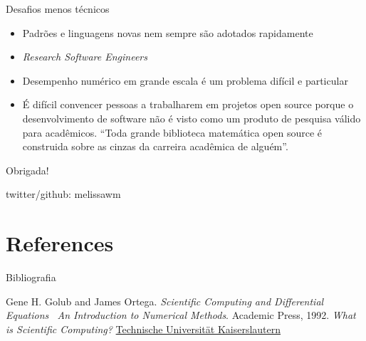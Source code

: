 \documentclass{beamer}
\begin{document}
\begin{darkframes}
  \begin{frame}{Desafios menos técnicos}
    \begin{itemize}
    \item<1-> Padrões e linguagens novas nem sempre são adotados rapidamente
    \item<2-> \emph{Research Software Engineers}%
    \item<3-> Desempenho numérico em grande escala é um problema difícil e particular %
    \item<4-> É difícil convencer pessoas a trabalharem em projetos open source porque o desenvolvimento de software não é visto como um produto de pesquisa válido para acadêmicos. ``Toda grande biblioteca matemática open source é construida sobre as cinzas da carreira acadêmica de alguém''.
    \end{itemize}
  \end{frame}

  \begin{frame}

    \begin{center}
      \begin{Huge}
        Obrigada!
      \end{Huge}
    \end{center}

    \vfill

    \begin{center}
      twitter/github: melissawm
    \end{center}
    
  \end{frame}
  
  \section{References}
  \begin{frame}[label=bibliography, allowframebreaks]{Bibliografia}
    \scriptsize{%
    \begin{thebibliography}{99}
      Gene H. Golub and James Ortega. \emph{Scientific Computing and Differential Equations \textemdash\ An Introduction to Numerical Methods}. Academic Press, 1992.
     \emph{What is Scientific Computing?} \hyperlink{https://www.scicomp.uni-kl.de/about/scientific-computing/}{Technische Universität Kaiserslautern}
      

\end{thebibliography}}
\end{frame}
\end{darkframes}
\end{document}
